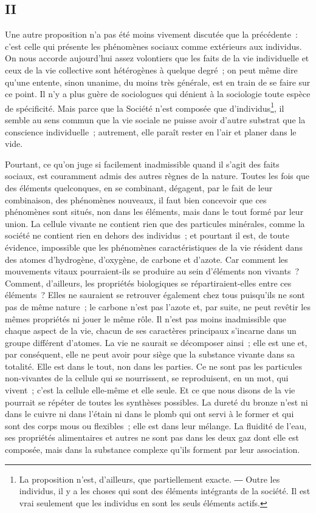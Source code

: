 \documentclass[french,twoside]{book} %
\begin{document}
\subsection[{II}]{II}
\noindent Une autre proposition n’a pas été moins vivement discutée que la précédente : c’est celle qui présente les phénomènes sociaux comme extérieurs aux individus. On nous accorde aujourd’hui assez volontiers que les faits de la vie individuelle et ceux de la vie collective sont hétérogènes à quelque degré ; on peut même dire qu’une entente, sinon unanime, du moins très générale, est en train de se faire sur ce point. Il n’y a plus guère de sociologues qui dénient à la sociologie toute espèce de spécificité. Mais parce que la Société n’est composée que d’individus\footnote{ La proposition n’est, d’ailleurs, que partiellement exacte. ― Outre les individus, il y a les choses qui sont des éléments intégrants de la société. Il est vrai seulement que les individus en sont les seuls éléments actifs.}, il semble au sens commun que la vie sociale ne puisse avoir d’autre substrat que la conscience individuelle ; autrement, elle paraît rester en l’air et planer dans le vide.\par
Pourtant, ce qu’on juge si facilement inadmissible quand il s’agit des faits sociaux, est couramment admis des autres règnes de la nature. Toutes les fois que des éléments quelconques, en se combinant, dégagent, par le fait de leur combinaison, des phénomènes nouveaux, il faut bien concevoir que ces phénomènes sont situés, non dans les éléments, mais dans le tout formé par leur union. La cellule vivante ne contient rien que des particules minérales, comme la société ne contient rien en dehors des individus ; et pourtant il est, de toute évidence, impossible que les phénomènes caractéristiques de la vie résident dans des atomes d’hydrogène, d’oxygène, de carbone et d’azote. Car comment les mouvements vitaux pourraient-ils se produire au sein d’éléments non vivants ? Comment, d’ailleurs, les propriétés biologiques se répartiraient-elles entre ces éléments ? Elles ne sauraient se retrouver également chez tous puisqu’ils ne sont pas de même nature ; le carbone n’est pas l’azote et, par suite, ne peut revêtir les mêmes propriétés ni jouer le même rôle. Il n’est pas moins inadmissible que chaque aspect de la vie, chacun de ses caractères principaux s’incarne dans un groupe différent d’atomes. La vie ne saurait se décomposer ainsi ; elle est une et, par conséquent, elle ne peut avoir pour siège que la substance vivante dans sa totalité. Elle est dans le tout, non dans les parties. Ce ne sont pas les particules non-vivantes de la cellule qui se nourrissent, se reproduisent, en un mot, qui vivent ; c’est la cellule elle-même et elle seule. Et ce que nous disons de la vie pourrait se répéter de toutes les synthèses possibles. La dureté du bronze n’est ni dans le cuivre ni dans l’étain ni dans le plomb qui ont servi à le former et qui sont des corps mous ou flexibles ; elle est dans leur mélange. La fluidité de l’eau, ses propriétés alimentaires et autres ne sont pas dans les deux gaz dont elle est composée, mais dans la substance complexe qu’ils forment par leur association.\par
\end{document}
